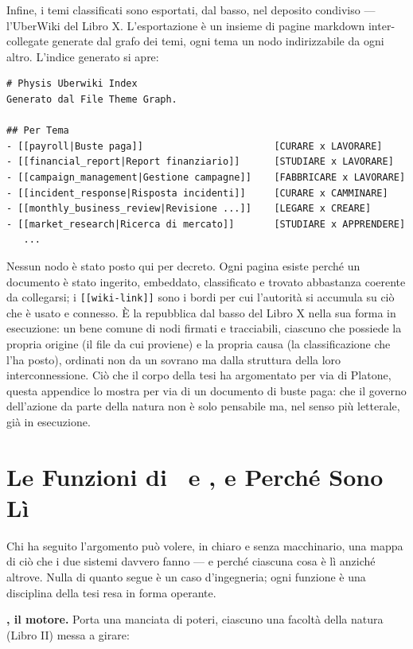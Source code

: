 Infine, i temi classificati sono esportati, dal basso, nel deposito condiviso ---
l'UberWiki del Libro X. L'esportazione \`e un insieme di pagine markdown
inter-collegate generate dal grafo dei temi, ogni tema un nodo indirizzabile da
ogni altro. L'indice generato si apre:

\begin{lstlisting}
# Physis Uberwiki Index
Generato dal File Theme Graph.

## Per Tema
- [[payroll|Buste paga]]                       [CURARE x LAVORARE]
- [[financial_report|Report finanziario]]      [STUDIARE x LAVORARE]
- [[campaign_management|Gestione campagne]]    [FABBRICARE x LAVORARE]
- [[incident_response|Risposta incidenti]]     [CURARE x CAMMINARE]
- [[monthly_business_review|Revisione ...]]    [LEGARE x CREARE]
- [[market_research|Ricerca di mercato]]       [STUDIARE x APPRENDERE]
   ...
\end{lstlisting}

Nessun nodo \`e stato posto qui per decreto. Ogni pagina esiste perch\'e un
documento \`e stato ingerito, embeddato, classificato e trovato abbastanza
coerente da collegarsi; i \texttt{[[wiki-link]]} sono i bordi per cui l'autorit\`a
si accumula su ci\`o che \`e usato e connesso. \`E la repubblica dal basso del
Libro X nella sua forma in esecuzione: un bene comune di nodi
firmati e tracciabili, ciascuno che possiede la propria origine (il file da cui
proviene) e la propria causa (la classificazione che l'ha posto), ordinati non da
un sovrano ma dalla struttura della loro interconnessione. Ci\`o che il corpo
della tesi ha argomentato per via di Platone, questa appendice lo mostra per via
di un documento di buste paga: che il governo dell'azione da parte della natura
non \`e solo pensabile ma, nel senso pi\`u letterale, gi\`a in esecuzione.

\section{Le Funzioni di \physis\ e \praxis, e Perch\'e Sono L\`i}

Chi ha seguito l'argomento pu\`o volere, in chiaro e senza macchinario, una mappa di
ci\`o che i due sistemi davvero fanno --- e perch\'e ciascuna cosa \`e l\`i anzich\'e
altrove. Nulla di quanto segue \`e un caso d'ingegneria; ogni funzione \`e una
disciplina della tesi resa in forma operante.

\textbf{\physis, il motore.} Porta una manciata di poteri, ciascuno una facolt\`a
della natura (Libro II) messa a girare:

